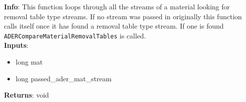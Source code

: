 \textbf{Info}: This function loops through
all the streams of a material looking for removal table type streams. 
If no stream was passed in originally this function calls itself once it has
found a removal table type stream. If
one is found \texttt{ADERCompareMaterialRemovalTables} is called. \\

\noindent \textbf{Inputs}:
\begin{itemize}
\item{long mat}
\item{long passed\_ader\_mat\_stream}
\end{itemize}

\noindent \textbf{Returns}: void
